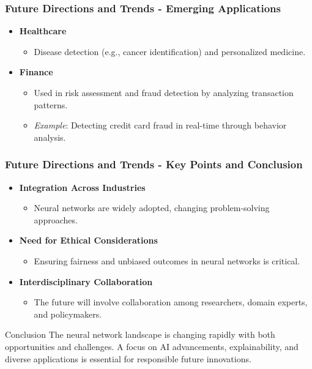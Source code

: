 \documentclass[aspectratio=169]{beamer}
\begin{document}
\begin{frame}[fragile]
    \frametitle{Future Directions and Trends - Emerging Applications}
    \begin{itemize}
        \item \textbf{Healthcare}
          \begin{itemize}
              \item Disease detection (e.g., cancer identification) and personalized medicine.
          \end{itemize}

        \item \textbf{Finance}
          \begin{itemize}
              \item Used in risk assessment and fraud detection by analyzing transaction patterns.
              \item \textit{Example}: Detecting credit card fraud in real-time through behavior analysis.
          \end{itemize}
    \end{itemize}
\end{frame}

\begin{frame}[fragile]
    \frametitle{Future Directions and Trends - Key Points and Conclusion}
    \begin{itemize}
        \item \textbf{Integration Across Industries}
          \begin{itemize}
              \item Neural networks are widely adopted, changing problem-solving approaches.
          \end{itemize}
          
        \item \textbf{Need for Ethical Considerations}
          \begin{itemize}
              \item Ensuring fairness and unbiased outcomes in neural networks is critical.
          \end{itemize}
          
        \item \textbf{Interdisciplinary Collaboration}
          \begin{itemize}
              \item The future will involve collaboration among researchers, domain experts, and policymakers.
          \end{itemize}
    \end{itemize}

    \begin{block}{Conclusion}
        The neural network landscape is changing rapidly with both opportunities and challenges. 
        A focus on AI advancements, explainability, and diverse applications is essential for responsible future innovations.
    \end{block}
\end{frame}
\end{document}
